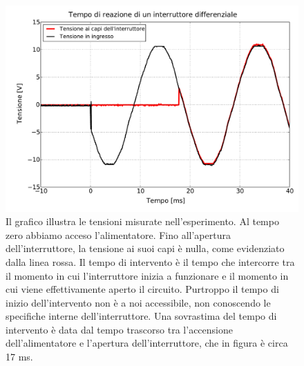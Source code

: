 \begin{figure}
    \includegraphics[scale=0.5]{tensione.pdf}
    \caption{Il grafico illustra le tensioni misurate nell'esperimento. Al tempo zero abbiamo acceso l'alimentatore.
    Fino all'apertura dell'interruttore, la tensione ai suoi capi è nulla, come evidenziato dalla linea rossa. Il tempo di intervento
    è il tempo che intercorre tra il momento in cui l'interruttore inizia a funzionare e il momento in cui viene effettivamente aperto
    il circuito. Purtroppo il tempo di inizio dell'intervento non è a noi accessibile, non conoscendo le specifiche
    interne dell'interruttore. Una sovrastima del tempo di intervento è data dal tempo trascorso tra l'accensione dell'alimentatore
    e l'apertura dell'interruttore, che in figura è circa 17 ms.}
    \label{fig:graph}
\end{figure}
